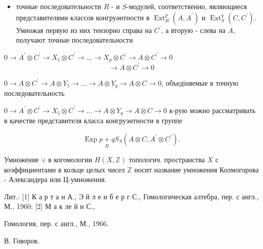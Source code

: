 \documentclass[10pt]{article}
\begin{document}
\begin{itemize}

  \item точные последовательности $R$ - и $S$-модулей, соответственно, являющиеся представителями классов конгруәнтности в $\operatorname{Ext}_{R}^{p}\left(A, A^{\prime}\right)$ и $\operatorname{Ext}_{S}^{q}\left(C, C^{\prime}\right)$. Умножая первую из них тензорно справа на $C^{\prime}$, а вторую - слева на $A$, получают точные последовательности

\end{itemize}



$0 \longrightarrow A^{\prime} \otimes C^{\prime} \longrightarrow X_{1} \otimes C^{\prime} \longrightarrow \ldots \longrightarrow X_{p} \otimes C^{\prime} \rightarrow A \otimes C^{\prime} \rightarrow 0$\[

\longrightarrow A \otimes C^{\prime} \longrightarrow 0

\]



$0 \longrightarrow A \otimes C^{\prime} \longrightarrow A \otimes Y_{1} \longrightarrow \ldots \rightarrow A \otimes Y_{q} \rightarrow A \otimes C \longrightarrow 0$, объедіняемые в точную последовательность



$0 \longrightarrow A^{\prime} \otimes C^{\prime} \longrightarrow X_{1} \otimes C^{\prime} \longrightarrow \ldots \rightarrow A \otimes Y_{q} \longrightarrow A \otimes C \longrightarrow 0$ к-рую можно рассматривать в качестве представителя класса конгруэнтности в группе



\[

\operatorname{Exp} \underset{R}{p+q} S_{S}\left(A \otimes C, A^{\prime} \otimes C^{\prime}\right) .

\]



Умножение $\vee$ в когомологии $H(X, \mathbb{Z})$ топологич. пространства $X$ с коэффициентами в кольце целых чисел $\mathbb{Z}$ носит название умножения Колмогорова - Александера или Ц-умножения.



Лит.: [1] К а р т а н А., Э й л е н б е р г С., Гомологическая алтебра, пер. с англ., М., 1960; [2] М а к ле й н С.,

Гомология, пер. с англ., М., 1966.

В. Говоров.
\end{document}
